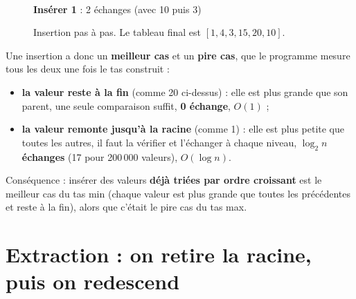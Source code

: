 \documentclass[11pt,a4paper]{article}
\begin{document}
\begin{figure}[H]
\begin{minipage}[t]{0.32\textwidth}
\\[2pt]
\small \textbf{Insérer 1} : 2 échanges (avec 10 puis 3)
\end{minipage}
\caption{Insertion pas à pas. Le tableau final est $[1, 4, 3, 15, 20, 10]$.}
\end{figure}

Une insertion a donc un \textbf{meilleur cas} et un \textbf{pire cas}, que le programme
mesure tous les deux une fois le tas construit :
\begin{itemize}
  \item \textbf{la valeur reste à la fin} (comme 20 ci-dessus) : elle est plus grande que
        son parent, une seule comparaison suffit, \textbf{0 échange}, $O(1)$ ;
  \item \textbf{la valeur remonte jusqu'à la racine} (comme 1) : elle est plus petite que
        toutes les autres, il faut la vérifier et l'échanger à chaque niveau,
        \textbf{$\log_2 n$ échanges} (17 pour 200\,000 valeurs), $O(\log n)$.
\end{itemize}
Conséquence : insérer des valeurs \textbf{déjà triées par ordre croissant} est le meilleur
cas du tas min (chaque valeur est plus grande que toutes les précédentes et reste à la fin),
alors que c'était le pire cas du tas max.

\section{Extraction : on retire la racine, puis on redescend}
\end{document}
